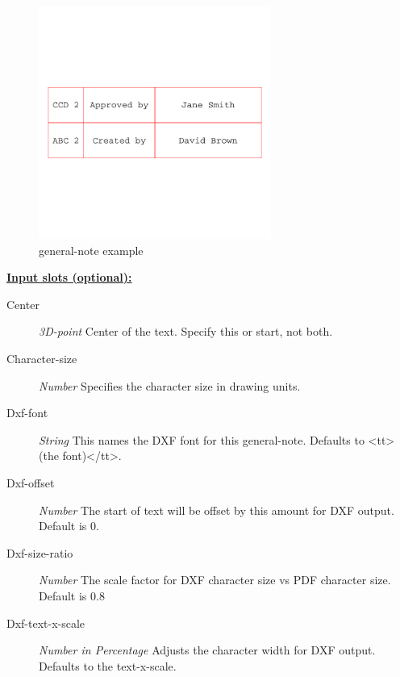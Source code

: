 \documentclass [11pt]{book}
\begin{document}
\begin{itemize}
\begin{figure}
\begin{center}
\includegraphics[width=3in,height=3in]{../images/example-general-note.pdf}
\end{center}

\caption{general-note example}

\label{fig:general-note}

\end{figure}





\textbf{
\underline{Input slots (optional):}}

\begin{description}

\item [Center]
\emph{3D-point} Center of the text. Specify this or start, not both.


\item [Character-size]
\emph{Number} Specifies the character size in drawing units.


\item [Dxf-font]
\emph{String} This names the DXF font for this general-note. Defaults to <tt>(the font)</tt>.


\item [Dxf-offset]
\emph{Number} The start of text will be offset by this amount for DXF output. Default is 0.


\item [Dxf-size-ratio]
\emph{Number} The scale factor for DXF character size vs PDF character size. Default is 0.8


\item [Dxf-text-x-scale]
\emph{Number in Percentage} Adjusts the character width for DXF output. Defaults to the text-x-scale.



\end{description}
\end{itemize}
\end{document}
